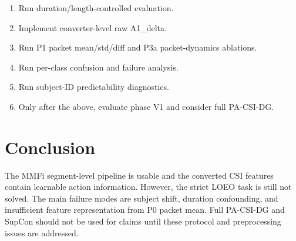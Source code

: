 \documentclass[11pt]{article}
\begin{document}
\begin{enumerate}
  \item Run duration/length-controlled evaluation.
  \item Implement converter-level raw A1\_delta.
  \item Run P1 packet mean/std/diff and P3a packet-dynamics ablations.
  \item Run per-class confusion and failure analysis.
  \item Run subject-ID predictability diagnostics.
  \item Only after the above, evaluate phase V1 and consider full PA-CSI-DG.
\end{enumerate}

\section{Conclusion}

The MMFi segment-level pipeline is usable and the converted CSI features contain learnable action information. However, the strict LOEO task is still not solved. The main failure modes are subject shift, duration confounding, and insufficient feature representation from P0 packet mean. Full PA-CSI-DG and SupCon should not be used for claims until these protocol and preprocessing issues are addressed.
\end{document}
